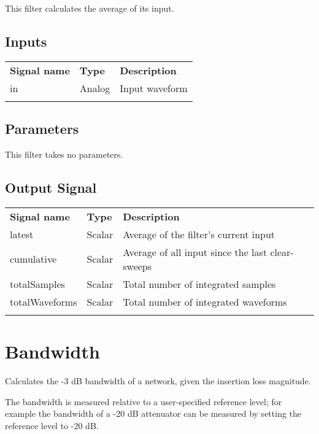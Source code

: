 This filter calculates the average of its input.

\subsection{Inputs}
\begin{tabularx}{16cm}{llX}
\thickhline
\textbf{Signal name} & \textbf{Type} & \textbf{Description} \\
\thickhline
in & Analog & Input waveform \\
\thickhline
\end{tabularx}

\subsection{Parameters}

This filter takes no parameters.

\subsection{Output Signal}

\begin{tabularx}{16cm}{llX}
\thickhline
\textbf{Signal name} & \textbf{Type} & \textbf{Description} \\
\thickhline
latest & Scalar & Average of the filter's current input \\
\thinhline
cumulative & Scalar & Average of all input since the last clear-sweeps\\
\thinhline
totalSamples & Scalar & Total number of integrated samples \\
\thinhline
totalWaveforms & Scalar & Total number of integrated waveforms \\
\thickhline
\end{tabularx}

\pagebreak
\section{Bandwidth}

Calculates the -3 dB bandwidth of a network, given the insertion loss magnitude.

The bandwidth is measured relative to a user-specified reference level; for example the bandwidth of a -20 dB
attenuator can be measured by setting the reference level to -20 dB.


